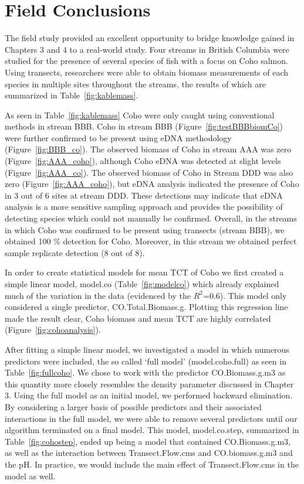 \section{Field Conclusions}

The field study provided an excellent opportunity to bridge knowledge gained in Chapters 3 and 4 to a real-world study. Four streams in British Columbia were studied for the presence of several species of fish with a focus on Coho salmon. Using transects, researchers were able to obtain biomass measurements of each species in multiple sites throughout the streams, the results of which are summarized in Table~\ref{fig:kablemass}.

\vspace{5mm}

As seen in Table~\ref{fig:kablemass} Coho were only caught using conventional methods in stream BBB. Coho in stream BBB (Figure~\ref{fig:testBBBbiomCo}) were further confirmed to be present using eDNA methodology (Figure~\ref{fig:BBB_co}). The observed biomass of Coho in stream AAA was zero (Figure~\ref{fig:AAA_coho}), although Coho eDNA was detected at slight levels (Figure~\ref{fig:AAA_co}). The observed biomass of Coho in Stream DDD was also zero (Figure~\ref{fig:AAA_coho}), but eDNA analysis indicated the presence of Coho in 3 out of 6 sites at stream DDD. These detections may indicate that eDNA analysis is a more sensitive sampling approach and provides the possibility of detecting species which could not manually be confirmed. Overall, in the streams in which Coho was confirmed to be present using transects (stream BBB), we obtained 100 \% detection for Coho. Moreover, in this stream we obtained perfect sample replicate detection (8 out of 8).


\vspace{5mm}


In order to create statistical models for mean TCT of Coho we first created a simple linear model, model.co (Table~\ref{fig:modelco}) which already explained much of the variation in the data (evidenced by the $R^{2}$=0.6). This model only considered a single predictor, CO.Total.Biomass.g.  Plotting this regression line made the result clear, Coho biomass and mean TCT are highly correlated (Figure~\ref{fig:cohoanalysis}).

\vspace{5mm}

After fitting a simple linear model, we investigated a model in which numerous predictors were included, the so called `full model' (model.coho.full) as seen in Table~\ref{fig:fullcoho}. We chose to work with the predictor CO.Biomass.g.m3 as this quantity more closely resembles the density parameter discussed in Chapter 3. Using the full model as an initial model, we performed backward elimination. By considering a larger basis of possible predictors and their associated interactions in the full model, we were able to remove several predictors until our algorithm terminated on a final model. This model, model.co.step, summarized in Table~\ref{fig:cohostep}, ended up being a model that contained CO.Biomass.g.m3, as well as the interaction between Transect.Flow.cms and CO.biomass.g.m3 and the pH. In practice, we would include the main effect of Transect.Flow.cms in the model as well.

